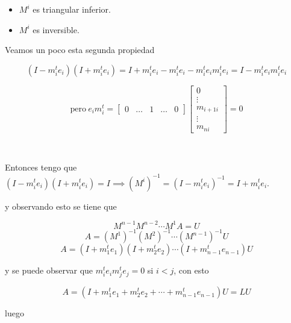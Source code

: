 \begin{itemize}
    \item $M^i$ es triangular inferior.
    \item $M^i$ es inversible.
\end{itemize}

Veamos un poco esta segunda propiedad

\[(I - m_{i}^{t}e_i)(I + m_{i}^{t}e_i) = I + m_{i}^{t}e_i - m_{i}^{t}e_i - m_{i}^{t}e_im_{i}^{t}e_i = I - m_{i}^{t}e_im_{i}^{t}e_i\]

\[\text{pero}~ e_{i}m_{i}^{t} = 
\begin{bmatrix}
0 & \ldots & 1 & \ldots & 0
\end{bmatrix}
\begin{bmatrix}
0 \\
\vdots \\
m_{i+1i} \\
\vdots \\
m_{ni}
\end{bmatrix}
= 0
\]

\

Entonces tengo que $(I - m_{i}^{t}e_i)(I + m_{i}^{t}e_i) = I \implies {(M^{i})}^{-1} = {(I - m_{i}^{t}e_i)}^{-1} = I + m_{i}^{t}e_i$.

y observando esto se tiene que

\[M^{n-1}M^{n-2}\cdots M^{1}A = U\]
\[A = {(M^1)}^{-1}{(M^2)}^{-1}\cdots{(M^{n-1})}^{-1}U\]
\[A=(I+m_{1}^{t}e_1)(I+m_{2}^{t}e_2)\cdots(I + m_{n-1}^{t}e_{n-1})U\]

y se puede observar que $m_{i}^{t}e_{i}m_{j}^{t}e_{j} = 0$ si $i < j$, con esto

\[A = (I + m_{1}^{t}e_{1} + m_{2}^{t}e_{2} + \cdots + m_{n-1}^{t}e_{n-1})U = LU\]

luego

